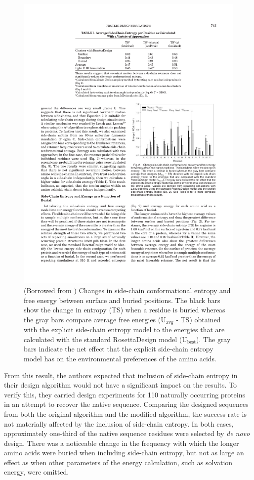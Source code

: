 \begin{figure}[h]
	\center
	\includegraphics{surface_vs_buried}
	\caption{(Borrowed from \cite{Hu:2006p68}) Changes in side-chain conformational entropy and free energy between surface and buried positions. The black bars show the change in entropy (TS) when a residue is buried whereas the gray bars compare average free energies ($\mathrm{U_{avg}}$ - TS) obtained with the explicit side-chain entropy model to the energies that are calculated with the standard RosettaDesign model ($\mathrm{U_{best}}$). The gray bars indicate the net effect that the explicit side-chain entropy model has on the environmental preferences of the amino acids.}
	\label{fig:surface_vs_buried}
\end{figure}

From this result, the authors expected that inclusion of side-chain entropy in their design algorithm would not have a significant impact on the results. To verify this, they carried design experiments for 110 naturally occurring proteins in an attempt to recover the native sequence. Comparing the designed sequences from both the original algorithm and the modified algorithm, the success rate is not materially affected by the inclusion of side-chain entropy. In both cases, approximately one-third of the native sequence residues were selected by \emph{de novo} design. There was a noticeable change in the frequency with which the longer amino acids were buried when including side-chain entropy, but not as large an effect as when other parameters of the energy calculation, such as solvation energy, were omitted.

